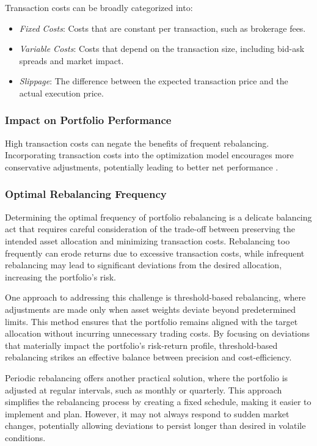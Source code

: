 Transaction costs can be broadly categorized into:

\begin{itemize}
    \item \textit{Fixed Costs}: Costs that are constant per transaction, such as brokerage fees.
    \item \textit{Variable Costs}: Costs that depend on the transaction size, including bid-ask spreads and market impact.
    \item \textit{Slippage}: The difference between the expected transaction price and the actual execution price.
\end{itemize}

\subsubsection{Impact on Portfolio Performance}

High transaction costs can negate the benefits of frequent rebalancing. Incorporating transaction costs into the optimization model encourages more conservative adjustments, potentially leading to better net performance \cite{garleanu2009dynamic}.

\subsubsection{Optimal Rebalancing Frequency}

Determining the optimal frequency of portfolio rebalancing is a delicate balancing act that requires careful consideration of the trade-off between preserving the intended asset allocation and minimizing transaction costs. Rebalancing too frequently can erode returns due to excessive transaction costs, while infrequent rebalancing may lead to significant deviations from the desired allocation, increasing the portfolio’s risk.

One approach to addressing this challenge is threshold-based rebalancing, where adjustments are made only when asset weights deviate beyond predetermined limits. This method ensures that the portfolio remains aligned with the target allocation without incurring unnecessary trading costs. By focusing on deviations that materially impact the portfolio's risk-return profile, threshold-based rebalancing strikes an effective balance between precision and cost-efficiency.

Periodic rebalancing offers another practical solution, where the portfolio is adjusted at regular intervals, such as monthly or quarterly. This approach simplifies the rebalancing process by creating a fixed schedule, making it easier to implement and plan. However, it may not always respond to sudden market changes, potentially allowing deviations to persist longer than desired in volatile conditions.

